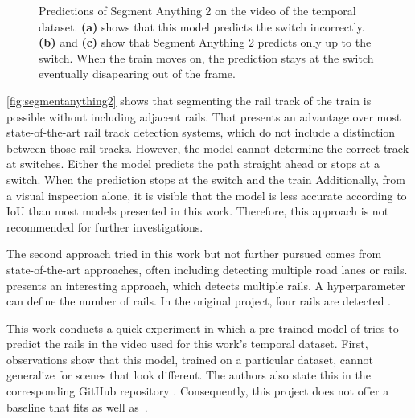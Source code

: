 \begin{figure}[H]
\begin{subfigure}{0.328\textwidth}
        \caption{}
        \label{fig:segmentanything2_c}
    \end{subfigure}
    \caption{Predictions of Segment Anything 2 \cite{segmentAnything22024} on the video of the temporal dataset. \textbf{(a)} shows that this model predicts the switch incorrectly. \textbf{(b)} and \textbf{(c)} show that Segment Anything 2 predicts only up to the switch. When the train moves on, the prediction stays at the switch eventually disapearing out of the frame.}
    \label{fig:segmentanything2}
\end{figure}

\autoref{fig:segmentanything2} shows that segmenting the rail track of the train is possible without including adjacent rails.
That presents an advantage over most state-of-the-art rail track detection systems, which do not include a distinction between those rail tracks.
However, the model cannot determine the correct track at switches.
Either the model predicts the path straight ahead or stops at a switch.
When the prediction stops at the switch and the train 
Additionally, from a visual inspection alone, it is visible that the model is less accurate according to IoU than most models presented in this work.
Therefore, this approach is not recommended for further investigations.

The second approach tried in this work but not further pursued comes from state-of-the-art approaches, often including detecting multiple road lanes or rails.
\cite{li2022rail} presents an interesting approach, which detects multiple rails.
A hyperparameter can define the number of rails.
In the original project, four rails are detected \cite{railNet2022GitHub}.

This work conducts a quick experiment in which a pre-trained model of \cite{li2022rail} tries to predict the rails in the video used for this work's temporal dataset.
First, observations show that this model, trained on a particular dataset, cannot generalize for scenes that look different.
The authors also state this in the corresponding GitHub repository \cite{railNet2022GitHub}.
Consequently, this project does not offer a baseline that fits as well as~\cite{tepNet2024}.

